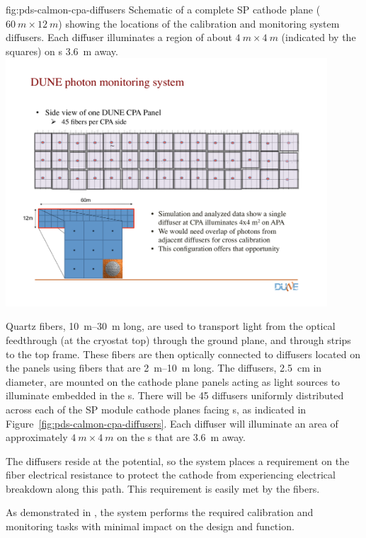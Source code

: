 \begin{dunefigure}
 {fig:pds-calmon-cpa-diffusers}
 {Schematic of a complete SP cathode plane ($\SI{60}{m}\times\SI{12}{m}$) showing the locations of the calibration and monitoring system diffusers. Each diffuser illuminates a region of about $\SI{4}{m}\times\SI{4}{m}$ (indicated by the squares) on s \SI{3.6}{m} away.}
\includegraphics[angle=0,width=0.9\textwidth]{graphics/pds-calibration-cpa}
\end{dunefigure}

Quartz fibers, \SIrange{10}{30}{m} long, are used to transport light from the optical feedthrough (at the cryostat top) through the  ground plane, and through  strips to the  top frame. 
These fibers are then optically connected to diffusers located on the  panels using fibers that are \SIrange{2}{10}{m} long. 
The diffusers, \SI{2.5}{cm} in diameter, are mounted on the cathode plane panels acting as light sources to illuminate  embedded in the s. There will be \num{45} diffusers uniformly distributed across each of the SP module cathode planes facing s, as indicated in 
Figure~\ref{fig:pds-calmon-cpa-diffusers}. Each diffuser will illuminate an area of approximately $\SI{4}{m}\times\SI{4}{m}$ on the s that are \SI{3.6}{m} away. 

The diffusers reside at the  potential, so the  system places a requirement on the fiber electrical resistance to protect the cathode from experiencing electrical breakdown along this path. This requirement is easily met by the fibers. 

As demonstrated in , the system performs the required calibration and monitoring tasks with minimal impact on the  design and function. 
